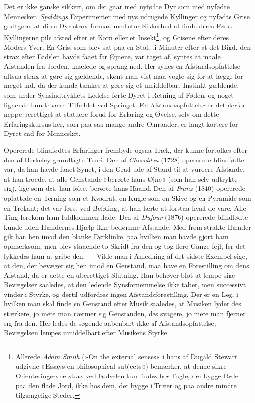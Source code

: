 \documentclass[12pt,a4paper,openany]{book}
\newcommand{\opage}[1]{\marginnote{\footnotesize\textit{[#1]}}}
\begin{document}
Det er ikke ganske sikkert, om det gaar med nyfødte Dyr som med nyfødte
Mennesker. \emph{Spaldings} Experimenter med nys udrugede Kyllinger og
nyfødte Grise godtgøre, at disse Dyr strax formaa med stor Sikkerhed at
finde deres Føde. Kyllingerne pile afsted efter et Korn eller et
Insekt\footnote[1]{Allerede \emph{Adam Smith} (»On the external senses«
i hans af Dugald Stewart udgivne »Essays en philosophical subjects«)
bemærker, at denne sikre Orienteringsevne strax ved Fødselen kun findes
hos Fugle, der bygge Rede paa den flade Jord, ikke hos dem, der bygge i
Træer og paa andre mindre tilgængelige Steder.}, og Grisene efter deres
Moders Yver. En Gris, som blev sat paa en Stol, ti Minuter efter at det
Bind, den strax efter Fødslen havde faaet for Øjnene, var taget af,
syntes at maale Afstanden fra Jorden, knælede og sprang ned. Her synes
en Afstandsopfattelse altsaa strax at gøre sig gældende, skønt man vist
maa vogte sig for at lægge for meget ind, da der kunde tænkes at gøre
sig et umiddelbart Instinkt gældende, som under Synsindtrykkets Ledelse
førte Dyret i Retning af Føden, og noget lignende kunde være Tilfældet
ved Springet. En Afstandsopfattelse er det derfor neppe berettiget at
statuere forud for Erfaring og Øvelse, selv om dette Erfaringskursus
her, som paa saa mange andre Omraader, er langt kortere for Dyret end
for Mennesket.

Opererede blindfødtes Erfaringer frembyde ogsaa Træk, der kunne
fortolkes efter den af Berkeley grundlagte Teori. Den af
\emph{Cheselden} (1728) opererede blindfødte var, da han havde faaet
Synet, i den Grad ude af Stand til at vurdere Afstande, at han troede,
at alle Genstande »berørte hans Øjne« (som han selv udtrykte sig), lige
som det, han følte, berørte hans Haand. Den af \emph{Franz} (1840)
opererede opfattede en Terning som et Kvadrat, en Kugle som en Skive og
en Pyramide som en Trekant; det var først ved Beføling, at han lærte at
forstaa hvad de vare. Alle Ting forekom ham fuldkommen flade. Den af
\emph{Dufour} (1876) opererede blindfødte kunde uden Hændernes Hjælp
ikke bedømme Afstande. Med frem%
\opage{240}strakte Hænder gik han hen imod den blanke Dørklinke, paa
hvilken man havde gjort ham opmærksom, men blev staaende to Skridt fra
den og tog flere Gange fejl, før det lykkedes ham at gribe den. ---
Vilde man i Anledning af det sidste Exempel sige, at den, der bevæger
sig hen imod en Genstand, maa have en Forestilling om dens Afstand, da
er dette en uberettiget Slutning. Han behøver blot at lempe sine
Bevægelser saaledes, at den ledende Synsfornemmelse ikke taber, men
successivt vinder i Styrke, og dertil udfordres ingen
Afstandsforestilling. Der er en Leg, i hvilken man skal finde en
Genstand efter Musik saaledes, at Musiken lyder des stærkere, jo mere
man nærmer sig Genstanden, des svagere, jo mere man fjerner sig fra den.
Her ledes de søgende aabenbart ikke af Afstandsopfattelse; Bevægelsen
lempes umiddelbart efter Musikens Styrke.
\end{document}
